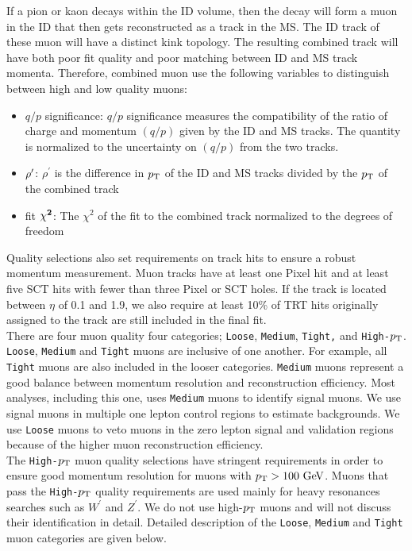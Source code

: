 \indent If a pion or kaon decays within the ID volume, then the decay will form a muon in the ID that then gets reconstructed as a track in the MS.  The ID track of these muon will have a distinct kink topology. The resulting combined track will have both poor fit quality and poor matching between ID and MS track momenta.  Therefore, combined muon use the following variables to distinguish between high and low quality muons: \\

\begin{itemize}
\item[] {$ q/p$ significance:} $q/p$ significance measures the compatibility of the ratio of charge and momentum $(q/p)$ given by the ID and MS tracks. The quantity is normalized to the uncertainty on $(q/p)$ from the two tracks.
\item[] { $\bf \rho^{\prime}$:} $\rho^{\prime}$ is the difference in $p_{\mathrm{T}}$ of the ID and MS tracks divided by the $p_{\mathrm{T}}$ of the combined track
\item[] { fit $\bf \chi^2$:} The $\chi^2$ of the fit to the combined track normalized to the degrees of freedom
\end{itemize}

\indent Quality selections also set requirements on track hits to ensure a robust momentum measurement.  Muon tracks have at least one Pixel hit and at least five SCT hits with fewer than three Pixel or SCT holes.  If the track is located between $\eta$ of 0.1 and 1.9, we also require at least 10\% of TRT hits originally assigned to the track are still included in the final fit.  \\

\indent There are four muon quality four categories; {\tt Loose}, {\tt Medium}, {\tt Tight,} and {\tt High-$p_{\mathrm{T}}$}.  {\tt Loose}, {\tt Medium} and {\tt Tight} muons are inclusive of one another.  For example, all {\tt Tight} muons are also included in the looser categories.  {\tt Medium} muons represent a good balance between momentum resolution and reconstruction efficiency.  Most analyses, including this one, uses {\tt Medium} muons to identify signal muons.  We use signal muons in multiple one lepton control regions to estimate backgrounds.  We use {\tt Loose} muons to veto muons in the zero lepton signal and validation regions because of the higher muon reconstruction efficiency. \\

\indent The {\tt High-$p_{\mathrm{T}}$} muon quality selections have stringent requirements in order to ensure good momentum resolution for muons with $\pt > 100 \gev$.  Muons that pass the {\tt High-$p_{\mathrm{T}}$} quality requirements are used mainly for heavy resonances searches such as $W^{\prime}$ and $Z^{\prime}$.  We do not use high-$p_{\mathrm{T}}$ muons and will not discuss their identification in detail.  Detailed description of the {\tt Loose}, {\tt Medium} and {\tt Tight} muon categories are given below.  \\

